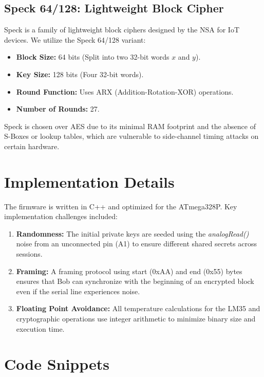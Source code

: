 \documentclass[12pt,a4paper]{article}
\begin{document}
\subsection{Speck 64/128: Lightweight Block Cipher}
Speck is a family of lightweight block ciphers designed by the NSA for IoT devices. We utilize the Speck 64/128 variant:
\begin{itemize}
    \item \textbf{Block Size:} 64 bits (Split into two 32-bit words $x$ and $y$).
    \item \textbf{Key Size:} 128 bits (Four 32-bit words).
    \item \textbf{Round Function:} Uses ARX (Addition-Rotation-XOR) operations.
    \item \textbf{Number of Rounds:} 27.
\end{itemize}
Speck is chosen over AES due to its minimal RAM footprint and the absence of S-Boxes or lookup tables, which are vulnerable to side-channel timing attacks on certain hardware.

\section{Implementation Details}
The firmware is written in C++ and optimized for the ATmega328P. Key implementation challenges included:
\begin{enumerate}
    \item \textbf{Randomness:} The initial private keys are seeded using the \textit{analogRead()} noise from an unconnected pin (A1) to ensure different shared secrets across sessions.
    \item \textbf{Framing:} A framing protocol using start (0xAA) and end (0x55) bytes ensures that Bob can synchronize with the beginning of an encrypted block even if the serial line experiences noise.
    \item \textbf{Floating Point Avoidance:} All temperature calculations for the LM35 and cryptographic operations use integer arithmetic to minimize binary size and execution time.
\end{enumerate}

\section{Code Snippets}
\end{document}
